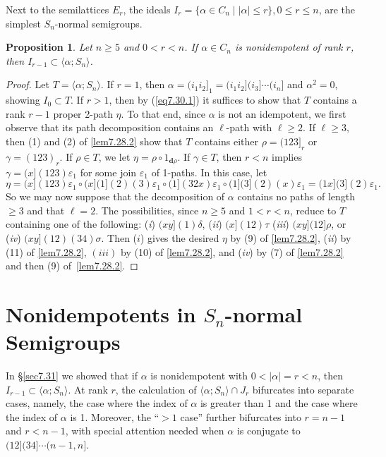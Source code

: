 \documentclass{surv-l}
\numberwithin{equation}{section}
\numberwithin{table}{section}
\numberwithin{figure}{section}
\theoremstyle{plain}
\newtheorem{proposition}[equation]{Proposition}
\theoremstyle{definition}
\begin{document}
Next to the semilattices $E_{r}$, the ideals $I_{r}=\{\alpha\in
C_{n}\mid |\alpha|\leq r\}, 0\leq r\leq n$, are the simplest
$S_{n}$-normal semigroups.

\begin{proposition}\label{prop2.31.2}
Let $n \geq 5$ and $0<r<n$. If $\alpha\in C_{n}$ is nonidempotent
of rank $r$, then $I_{r-1}\subset\langle\alpha;S_{n}\rangle$.
\end{proposition}

\begin{proof}Let $T=\langle\alpha;S_{n}\rangle$. If $r=1$, then
$\alpha=(i_{1}i_{2}]_{1}=(i_{1}i_{2}](i_{3}]\cdots(i_{n}]$ and
$\alpha^{2}=0$, showing $I_{0}\subset T$. If $r>1$, then by
(\ref{eq7.30.1}) it suffices to show that $T$ contains a rank
$r-1$ proper 2-path $\eta$. To that end, since $\alpha$ is not an
idempotent, we first observe that its path decomposition contains
an $\ell$-path with $\ell\geq 2$. If $\ell\geq 3$, then (1) and
(2) of \ref{lem7.28.2} show that $T$ contains either
$\rho=(123]_{r}$ or $\gamma=(123)_{r}$. If $\rho\in T$, we let
$\eta=\rho \circ 1_{\mathbf{d}\rho}$. If $\gamma\in T$, then $r<n$
implies $\gamma=(x](123)\varepsilon_{1}$ for some join
$\varepsilon_{1}$ of 1-paths. In this case, let
\[
\eta=(x](123)\varepsilon_{1}\circ
(x](1](2)(3)\varepsilon_{1}\circ (1](32x)\varepsilon_{1}\circ
(1](3](2)(x)\varepsilon_{1}=(1x](3](2)\varepsilon_{1}.
\]
So we may now suppose that the decomposition of $\alpha$ contains
no paths of length $\geq 3$ and that $\ell=2$. The possibilities,
since $n \geq 5$ and $1<r<n$, reduce to $T$ containing one of the
following: (\emph{i}) $(xy](1)\delta$, (\emph{ii}) $(x](12)\tau$ (\emph{iii}) $(xy](12]\rho$,
or (\emph{iv}) $(xy](12)(34)\sigma$. Then ($i$) gives the desired
$\eta$ by (9) of \ref{lem7.28.2}, (\emph{ii}) by (11) of
\ref{lem7.28.2}, $(iii)$ by (10) of \ref{lem7.28.2}, and
(\emph{iv}) by (7) of \ref{lem7.28.2} and then (9)
of~\ref{lem7.28.2}.
\end{proof}

\section{Nonidempotents in $S_{n}$-normal Semigroups}\label{sec7.32}

In \S\ref{sec7.31} we showed that if $\alpha$ is nonidempotent
with $0<|\alpha|=r<n$, then
$I_{r-1}\subset\langle\alpha;S_{n}\rangle$. At rank $r$, the
calculation of $\langle\alpha;S_{n}\rangle\cap J_{r}$ bifurcates into
separate cases, namely, the case where the index of $\alpha$ is
greater than 1 and the case where the index of $\alpha$ is 1.
Moreover, the ``$>1$ case'' further bifurcates into $r=n -1$ and
$r<n -1$, with special attention needed when $\alpha$ is conjugate
to $(12](34]\cdots(n-1, n]$.
\end{document}

